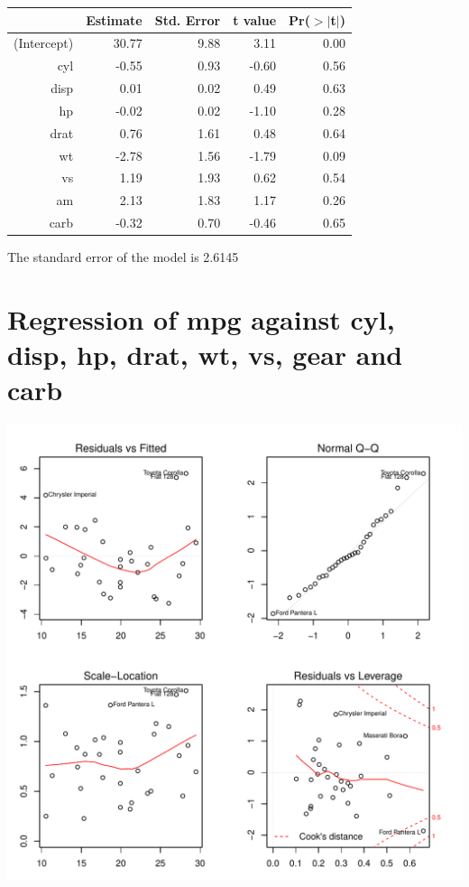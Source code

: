 \documentclass{article}\usepackage[]{graphicx}\usepackage[]{color}
\makeatletter
\def\maxwidth{ %
  \ifdim\Gin@nat@width>\linewidth
    \linewidth
  \else
    \Gin@nat@width
  \fi
}
\newenvironment{knitrout}{}{} %
\makeatother
\begin{document}
\begin{table}[ht]
\centering
\begin{tabular}{rrrrr}
  \hline
 & Estimate & Std. Error & t value & Pr($>$$|$t$|$) \\ 
  \hline
(Intercept) & 30.77 & 9.88 & 3.11 & 0.00 \\ 
  cyl & -0.55 & 0.93 & -0.60 & 0.56 \\ 
  disp & 0.01 & 0.02 & 0.49 & 0.63 \\ 
  hp & -0.02 & 0.02 & -1.10 & 0.28 \\ 
  drat & 0.76 & 1.61 & 0.48 & 0.64 \\ 
  wt & -2.78 & 1.56 & -1.79 & 0.09 \\ 
  vs & 1.19 & 1.93 & 0.62 & 0.54 \\ 
  am & 2.13 & 1.83 & 1.17 & 0.26 \\ 
  carb & -0.32 & 0.70 & -0.46 & 0.65 \\ 
   \hline
\end{tabular}
\end{table}




The standard error of the model is 2.6145

\newpage

\section{Regression of mpg against cyl, disp, hp, drat, wt, vs, gear and carb }
\begin{knitrout}
\color{fgcolor}

{\centering \includegraphics[width=\maxwidth]{figure/lm-cyl-disp-hp-drat-wt-vs-gear-carb} 

}



\end{knitrout}
\end{document}
